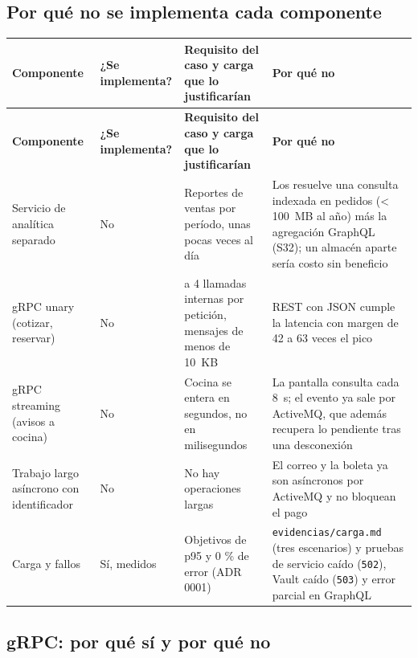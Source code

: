 \subsection{Por qué no se implementa cada componente}

{\small
\setlength{\tabcolsep}{3pt}\renewcommand{\arraystretch}{1.15}
\begin{longtable}{|>{\raggedright\arraybackslash}p{}|>{\raggedright\arraybackslash}p{}|>{\raggedright\arraybackslash}p{}|>{\raggedright\arraybackslash}p{}|}
\hline
\textbf{Componente} & \textbf{¿Se implementa?} & \textbf{Requisito del caso y carga que lo justificarían} & \textbf{Por qué no} \\ \hline
\endfirsthead
\hline
\textbf{Componente} & \textbf{¿Se implementa?} & \textbf{Requisito del caso y carga que lo justificarían} & \textbf{Por qué no} \\ \hline
\endhead
Servicio de analítica separado & No & Reportes de ventas por período, unas pocas veces al día & Los resuelve una consulta indexada en pedidos (< 100~MB al año) más la agregación GraphQL (S32); un almacén aparte sería costo sin beneficio \\ \hline
gRPC unary (cotizar, reservar) & No & 2 a 4 llamadas internas por petición, mensajes de menos de 10~KB & REST con JSON cumple la latencia con margen de 42 a 63 veces el pico \\ \hline
gRPC streaming (avisos a cocina) & No & Cocina se entera en segundos, no en milisegundos & La pantalla consulta cada 8~s; el evento ya sale por ActiveMQ, que además recupera lo pendiente tras una desconexión \\ \hline
Trabajo largo asíncrono con identificador & No & No hay operaciones largas & El correo y la boleta ya son asíncronos por ActiveMQ y no bloquean el pago \\ \hline
Carga y fallos & Sí, medidos & Objetivos de p95 y 0 \% de error (ADR 0001) & \texttt{evidencias/\allowbreak{}carga.\allowbreak{}md} (tres escenarios) y pruebas de servicio caído (\texttt{502}), Vault caído (\texttt{503}) y error parcial en GraphQL \\ \hline
\end{longtable}
}

\subsection{gRPC: por qué sí y por qué no}

